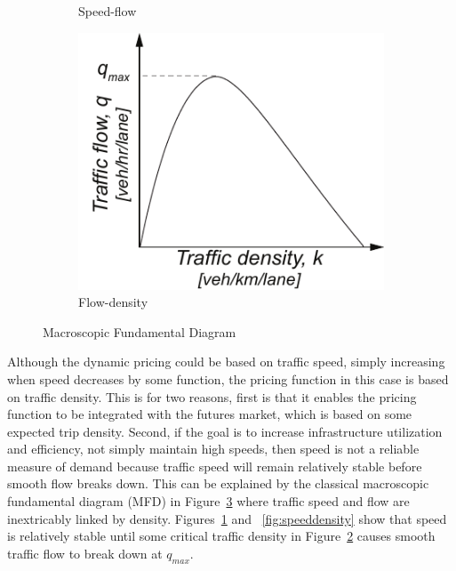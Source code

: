 \documentclass{article}
\begin{document}
\begin{figure}[ht!]
\begin{subfigure}[h]{0.25\linewidth}
		\caption{Speed-flow}
		\label{fig:speedflow}
	\end{subfigure}
	\hfill
	\begin{subfigure}[h]{0.25\linewidth}
		\centering
		\includegraphics[width=\textwidth]{figures/flowdensity}
		\caption{Flow-density}
		\label{fig:flowdensity}
	\end{subfigure}
	\hfill
	\caption{Macroscopic Fundamental Diagram}
	\label{fig:MFD}
\end{figure}

Although the dynamic pricing could be based on traffic speed, simply increasing when speed decreases by some function, the pricing function in this case is based on traffic density. This is for two reasons, first is that it enables the pricing function to be integrated with the futures market, which is based on some expected trip density. Second, if the goal is to increase infrastructure utilization and efficiency, not simply maintain high speeds, then speed is not a reliable measure of demand because traffic speed will remain relatively stable before smooth flow breaks down. This can be explained by the classical macroscopic fundamental diagram (MFD) in Figure~\ref{fig:MFD} where traffic speed and flow are inextricably linked by density. Figures~\ref{fig:speedflow} and ~\ref{fig:speeddensity} show that speed is relatively stable until some critical traffic density in Figure~\ref{fig:flowdensity} causes smooth traffic flow to break down at $q_{max}$.
\end{document}
